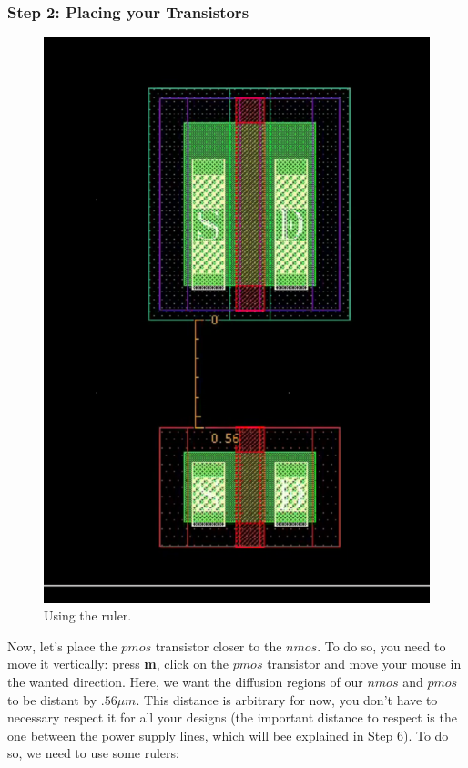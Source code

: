 \subsubsection*{Step 2: Placing your Transistors}
\parbox[t]{\dimexpr\textwidth-\leftmargin}{%
	\begin{figure}
		\vspace{-0mm}
		\centering
		\vspace{-\baselineskip}
		\includegraphics[scale=0.28]{figures/lab2/1}
				\caption{Using the ruler.}
	\end{figure}
	Now, let's place the $pmos$ transistor closer to the $nmos$. To do so, you need to move it vertically: press \textbf{m}, click on the $pmos$ transistor and move your mouse in the wanted direction. Here, we want the diffusion regions of our $nmos$ and $pmos$ to be distant by $.56 \mu m$. This distance is arbitrary for now, you don't have to necessary respect it for all your designs (the important distance to respect is the one between the power supply lines, which will bee explained in Step 6). To do so, we need to use some rulers:
}
